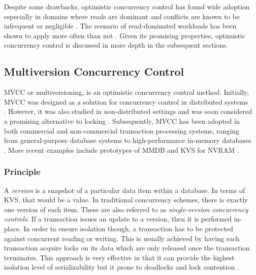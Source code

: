 Despite some drawbacks, optimistic concurrency control has found wide adoption
especially in domains where reads are dominant and conflicts are known to be
infrequent or negligible \cite{carey1986performance, larson2011high,
wu2017empirical}. The scenario of read-dominated workloads has been shown to
apply more often than not \cite{andrei2017sap, wang2017efficiently}. Given its
promising properties, optimistic concurrency control is discussed in more depth
in the subsequent sections.

\subsection{Multiversion Concurrency Control}

MVCC or multiversioning, is an optimistic concurrency control method. Initially,
MVCC was designed as a solution for concurrency control in distributed systems
\cite{reed1978naming}. However, it was also studied in non-distributed settings
and was soon considered a promising alternative to locking
\cite{kung1981optimistic, bernstein1983multiversion, carey1983multiple,
hadzilacos1986algorithmic, carey1986performance}. Subsequently, MVCC has been
adopted in both commercial and non-commercial transaction processing systems,
ranging from general-purpose database systems to high-performance in-memory
databases \cite{larson2011high, lee2013high, diaconu2013hekaton,
schwalb2015efficient}. More recent examples include prototypes of MMDB and KVS
for NVRAM \cite{bailey2013exploring, zhou2016nvht, oukid2014sofort,
schwalb2016hyrise}.

\subsubsection{Principle}

A \emph{version} is a snapshot of a particular data item within a database. In
terms of KVS, that would be a value. In traditional concurrency schemes, there
is exactly one version of each item. These are also referred to as
\emph{single-version concurrency controls}. If a transaction issues an update to
a version, then it is performed in-place. In order to ensure isolation though, a
transaction has to be protected against concurrent reading or writing. This is
usually achieved by having each transaction acquire locks on its data which are
only released once the transaction terminates. This approach is very effective
in that it can provide the highest isolation level of serializability but it
prone to deadlocks and lock contention \cite{berenson1995critique}.

